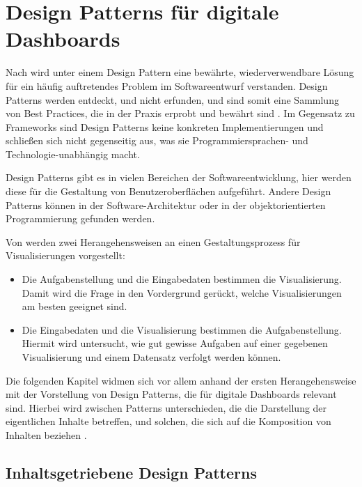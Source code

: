 \section{Design Patterns für digitale Dashboards}\label{sec:design-patterns-list}

Nach \autocite[S. xi]{Gamma.DesignPatterns.1994} wird unter einem Design Pattern eine bewährte, wiederverwendbare Lösung für ein häufig auftretendes Problem im Softwareentwurf verstanden.
Design Patterns werden entdeckt, und nicht erfunden, und sind somit eine Sammlung von Best Practices, die in der Praxis erprobt und bewährt sind \autocite{Few.InformationDashboardDesign.2013}.
Im Gegensatz zu Frameworks sind Design Patterns keine konkreten Implementierungen und schließen sich nicht gegenseitig aus, was sie Programmiersprachen- und Technologie-unabhängig macht.

Design Patterns gibt es in vielen Bereichen der Softwareentwicklung, hier werden diese für die Gestaltung von Benutzeroberflächen aufgeführt.
Andere Design Patterns können in der Software-Architektur oder in der objektorientierten Programmierung \autocite{Gamma.DesignPatterns.1994} gefunden werden.

Von \autocite[S. 2367]{Schulz.DesignSpaceVisualizationTasks.2013} werden zwei Herangehensweisen an einen Gestaltungsprozess für Visualisierungen vorgestellt:

\begin{itemize}
    \item Die Aufgabenstellung und die Eingabedaten bestimmen die Visualisierung.
    Damit wird die Frage in den Vordergrund gerückt, welche Visualisierungen am besten geeignet sind.
    \item Die Eingabedaten und die Visualisierung bestimmen die Aufgabenstellung.
    Hiermit wird untersucht, wie gut gewisse Aufgaben auf einer gegebenen Visualisierung und einem Datensatz verfolgt werden können.
\end{itemize}

Die folgenden Kapitel widmen sich vor allem anhand der ersten Herangehensweise mit der Vorstellung von Design Patterns, die für digitale Dashboards relevant sind.
Hierbei wird zwischen Patterns unterschieden, die die Darstellung der eigentlichen Inhalte betreffen, und solchen, die sich auf die Komposition von Inhalten beziehen \autocite[S. 3--5]{Bach.DashboardDesignPatterns.2023}.


\subsection{Inhaltsgetriebene Design Patterns}\label{subsec:content-design-patterns}

